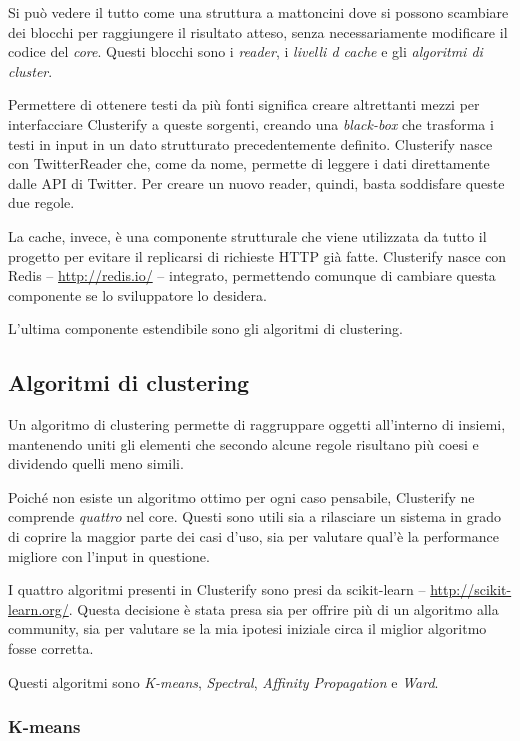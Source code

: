 	Si può vedere il tutto come una struttura a mattoncini dove si possono scambiare dei blocchi per raggiungere il risultato atteso, senza necessariamente modificare il codice del \emph{core}. Questi blocchi sono i \emph{reader}, i \emph{livelli d cache} e gli \emph{algoritmi di cluster}.
	
	Permettere di ottenere testi da più fonti significa creare altrettanti mezzi per interfacciare Clusterify a queste sorgenti, creando una \emph{black-box} che trasforma i testi in input in un dato strutturato precedentemente definito. Clusterify nasce con TwitterReader che, come da nome, permette di leggere i dati direttamente dalle API di Twitter. Per creare un nuovo reader, quindi, basta soddisfare queste due regole.

	La cache, invece, è una componente strutturale che viene utilizzata da tutto il progetto per evitare il replicarsi di richieste HTTP già fatte. Clusterify nasce con Redis -- \url{http://redis.io/} -- integrato, permettendo comunque di cambiare questa componente se lo sviluppatore lo desidera.

	L'ultima componente estendibile sono gli algoritmi di clustering.

	\subsection{Algoritmi di clustering}
		Un algoritmo di clustering permette di raggruppare oggetti all'interno di insiemi, mantenendo uniti gli elementi che secondo alcune regole risultano più coesi e dividendo quelli meno simili.

		Poiché non esiste un algoritmo ottimo per ogni caso pensabile, Clusterify ne comprende \emph{quattro} nel core. Questi sono utili sia a rilasciare un sistema in grado di coprire la maggior parte dei casi d'uso, sia per valutare qual'è la performance migliore con l'input in questione.

		I quattro algoritmi presenti in Clusterify sono presi da scikit-learn -- \url{http://scikit-learn.org/}. Questa decisione è stata presa sia per offrire più di un algoritmo alla community, sia per valutare se la mia ipotesi iniziale circa il miglior algoritmo fosse corretta. 

		Questi algoritmi sono \emph{K-means}, \emph{Spectral}, \emph{Affinity Propagation} e \emph{Ward}.

		\subsubsection{K-means}
			

